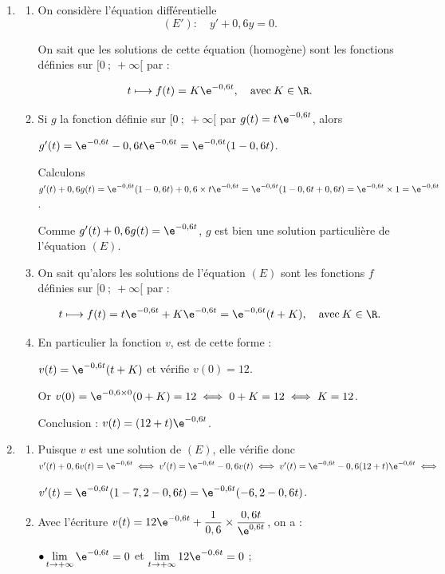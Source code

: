 \begin{enumerate}
\item 
	\begin{enumerate}
		\item On considère l'équation différentielle 
		\[(E') :\quad y' + 0,6y = 0.\]

On sait que les solutions de cette équation (homogène) sont les fonctions définies sur $[0~;~+ \infty[$ par :

\[t \longmapsto f(t) = K\e^{-0,6t}, \quad \text{avec}\: K \in \R.\]
		\item Si $g$ la fonction définie sur $[0~;~+\infty[$ par $g(t) = t\e^{-0,6t}$, alors 

$g'(t) = \e^{-0,6t} - 0,6t\e^{-0,6t} = \e^{-0,6t}(1 - 0,6t)$.

Calculons $g'(t) + 0,6g(t) = \e^{-0,6t}(1 - 0,6t) + 0,6 \times t\e^{-0,6t} = \e^{-0,6t}(1 - 0,6t + 0,6t) = \e^{-0,6t} \times 1 = \e^{-0,6t}$.

Comme $g'(t) + 0,6g(t) = \e^{-0,6t}$, $g$ est bien une solution particulière de l'équation $(E)$.

		\item On sait qu'alors les solutions de l'équation $(E)$ sont les fonctions  $f$ définies sur $[0~;~+ \infty[$ par :
		
\[t \longmapsto f(t) = t\e^{-0,6t} + K\e^{-0,6t} = \e^{-0,6t}(t + K),  \quad \text{avec}\: K \in \R.\]
\item En particulier la fonction $v$, est de cette forme :

$v(t) = \e^{-0,6t}(t + K)$  et vérifie $v(0) = 12$.

Or $v(0) = \e^{-0,6\times 0}(0 + K) = 12 \iff 0 + K = 12 \iff K = 12$.

Conclusion : $v(t) = (12 + t)\e^{-0,6t}$.
	\end{enumerate}
\item 
	\begin{enumerate}
		\item Puisque $v$ est une solution de $(E)$, elle vérifie donc $v'(t) + 0,6v(t) = \e^{-0,6t}\iff v'(t)  = \e^{-0,6t} - 0,6v(t) \iff v'(t) = \e^{-0,6t} - 0,6(12 + t)\e^{-0,6t} \iff$

$ v'(t) = \e^{-0,6t}(1 - 7,2 - 0,6t) = \e^{-0,6t}(- 6,2 - 0,6t)$.
		\item Avec l'écriture $v(t) = 12\e^{-0,6t} + \dfrac{1}{0,6} \times \dfrac{0,6t}{\e^{0,6t}}$, on a :

$\bullet \displaystyle\lim_{t \to + \infty} \e^{-0,6t} = 0$ et $\displaystyle\lim_{t \to + \infty} 12\e^{-0,6t} = 0$ ;


\end{enumerate}
\end{enumerate}
